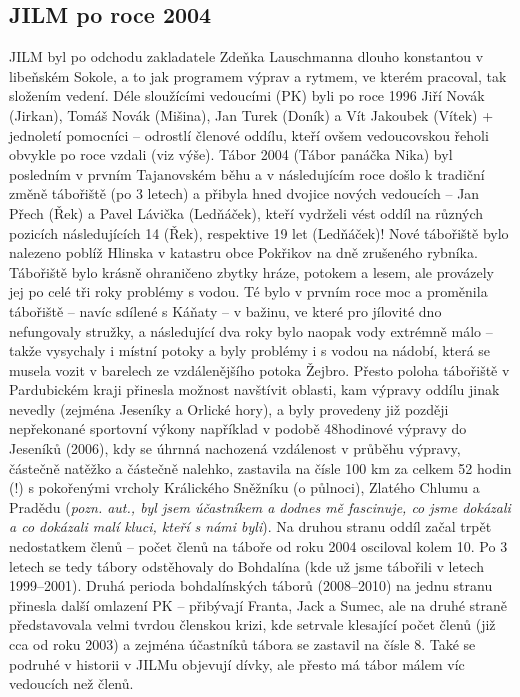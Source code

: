 \subsection{JILM po roce 2004}\label{jilm-po-roce-2004}

JILM byl po odchodu zakladatele Zdeňka Lauschmanna dlouho konstantou v
libeňském Sokole, a to jak programem výprav a rytmem, ve kterém
pracoval, tak složením vedení. Déle sloužícími vedoucími (PK) byli po
roce 1996 Jiří Novák (Jirkan), Tomáš Novák (Mišina), Jan Turek (Doník) a
Vít Jakoubek (Vítek) + jednoletí pomocníci -- odrostlí členové oddílu,
kteří ovšem vedoucovskou řeholi obvykle po roce vzdali (viz výše). Tábor
2004 (Tábor panáčka Nika) byl posledním v prvním Tajanovském běhu a v
následujícím roce došlo k tradiční změně tábořiště (po 3 letech) a
přibyla hned dvojice nových vedoucích -- Jan Přech (Řek) a Pavel Lávička
(Ledňáček), kteří vydrželi vést oddíl na různých pozicích následujících
14 (Řek), respektive 19 let (Ledňáček)! Nové tábořiště bylo nalezeno
poblíž Hlinska v katastru obce Pokřikov na dně zrušeného rybníka.
Tábořiště bylo krásně ohraničeno zbytky hráze, potokem a lesem, ale
provázely jej po celé tři roky problémy s vodou. Té bylo v prvním roce
moc a proměnila tábořiště -- navíc sdílené s Káňaty -- v bažinu, ve
které pro jílovité dno nefungovaly stružky, a následující dva roky bylo
naopak vody extrémně málo -- takže vysychaly i místní potoky a byly
problémy i s vodou na nádobí, která se musela vozit v barelech ze
vzdálenějšího potoka Žejbro. Přesto poloha tábořiště v Pardubickém kraji
přinesla možnost navštívit oblasti, kam výpravy oddílu jinak nevedly
(zejména Jeseníky a Orlické hory), a byly provedeny již později
nepřekonané sportovní výkony například v podobě 48hodinové výpravy do
Jeseníků (2006), kdy se úhrnná nachozená vzdálenost v průběhu výpravy,
částečně natěžko a částečně nalehko, zastavila na čísle 100 km za celkem
52 hodin (!) s pokořenými vrcholy Králického Sněžníku (o půlnoci),
Zlatého Chlumu a Pradědu (\emph{pozn. aut., byl jsem účastníkem a dodnes
mě fascinuje, co jsme dokázali a co dokázali malí kluci, kteří s námi
byli}). Na druhou stranu oddíl začal trpět nedostatkem členů -- počet
členů na táboře od roku 2004 osciloval kolem 10. Po 3 letech se tedy
tábory odstěhovaly do Bohdalína (kde už jsme tábořili v letech
1999--2001). Druhá perioda bohdalínských táborů (2008--2010) na jednu
stranu přinesla další omlazení PK -- přibývají Franta, Jack a Sumec, ale
na druhé straně představovala velmi tvrdou členskou krizi, kde setrvale
klesající počet členů (již cca od roku 2003) a zejména účastníků tábora
se zastavil na čísle 8. Také se podruhé v historii v JILMu objevují
dívky, ale přesto má tábor málem víc vedoucích než členů.

